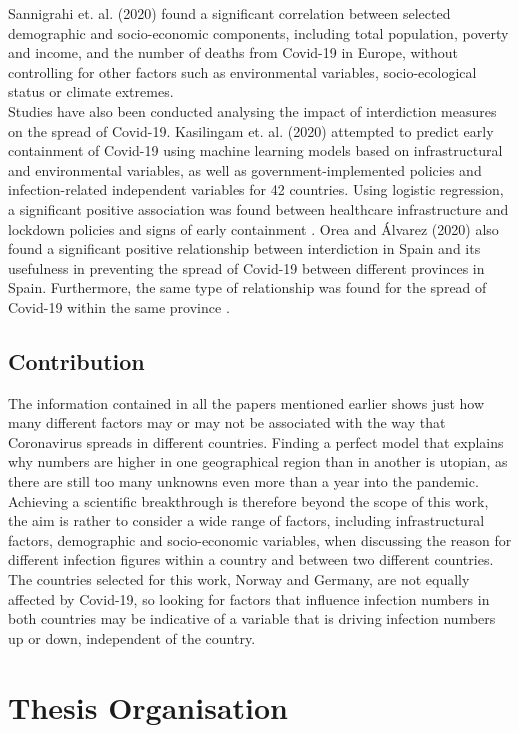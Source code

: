 Sannigrahi et. al. (2020) found a significant correlation between selected demographic and socio-economic components, including total population, poverty and income, and the number of deaths from Covid-19 in Europe, without controlling for other factors such as environmental variables, socio-ecological status or climate extremes\autocite[][]{sannigrahi2020examining}. \\
Studies have also been conducted analysing the impact of interdiction measures on the spread of Covid-19. Kasilingam et. al. (2020) attempted to predict early containment of Covid-19 using machine learning models based on infrastructural and environmental variables, as well as government-implemented policies and infection-related independent variables for 42 countries. Using logistic regression, a significant positive association was found between healthcare infrastructure and lockdown policies and signs of early containment \autocite[][]{kasilingam2020exploring}.
Orea and Álvarez (2020) also found a significant positive relationship between interdiction in Spain and its usefulness in preventing the spread of Covid-19 between different provinces in Spain. Furthermore, the same type of relationship was found for the spread of Covid-19 within the same province \autocite[][]{orea2020effective}. \\
\subsection*{Contribution}
The information contained in all the papers mentioned earlier shows just how many different factors may or may not be associated with the way that Coronavirus spreads in different countries. Finding a perfect model that explains why numbers are higher in one geographical region than in another is utopian, as there are still too many unknowns even more than a year into the pandemic. Achieving a scientific breakthrough is therefore beyond the scope of this work, the aim is rather to consider a wide range of factors, including infrastructural factors, demographic and socio-economic variables, when discussing the reason for different infection figures within a country and between two different countries. The countries selected for this work, Norway and Germany, are not equally affected by Covid-19, so looking for factors that influence infection numbers in both countries may be indicative of a variable that is driving infection numbers up or down, independent of the country.
\clearpage
\section{Thesis Organisation}



